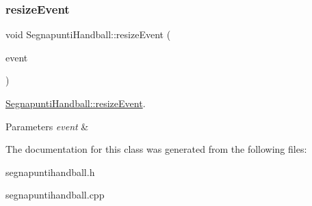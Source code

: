 \subsubsection{\texorpdfstring{resize\+Event}{resizeEvent}}
{\footnotesize\ttfamily void Segnapunti\+Handball\+::resize\+Event (\begin{DoxyParamCaption}\item[{Q\+Resize\+Event $\ast$}]{event }\end{DoxyParamCaption})\hspace{0.3cm}{\ttfamily [slot]}}



\mbox{\hyperlink{classSegnapuntiHandball_ab5f75180cb963fdc1d19899735affde9}{Segnapunti\+Handball\+::resize\+Event}}. 


\begin{DoxyParams}{Parameters}
{\em event} & \\
\hline
\end{DoxyParams}


The documentation for this class was generated from the following files\+:\begin{DoxyCompactItemize}
\item 
segnapuntihandball.\+h\item 
segnapuntihandball.\+cpp\end{DoxyCompactItemize}
